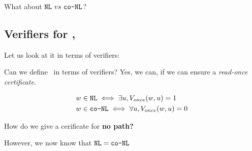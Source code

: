 What about $\texttt{NL}~vs~\texttt{co-NL}$?

\subsection{Verifiers for \nlogspace, \conlogspace}
Let us look at it in terms of verifiers:

Can we define \nlogspace~in terms of verifiers? Yes, we can, if we can ensure
a \textit{read-once certificate}.

\begin{align*}
    w &\in \texttt{NL} \iff \exists u, V_{once}(w, u) = 1 \\
    w &\in \texttt{co-NL} \iff \forall u, V_{once}(w, u) = 0 \\
\end{align*}

How do we give a cerificate for \textbf{no path?}

However, we now know that $\texttt{NL} = \texttt{co-NL}$
